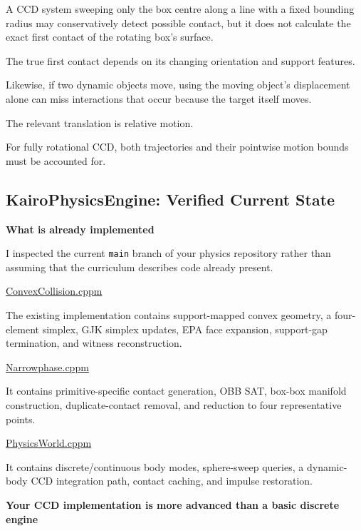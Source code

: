 A CCD system sweeping only the box centre along a line with a fixed bounding radius may conservatively detect possible contact, but it does not calculate the exact first contact of the rotating box's surface.

The true first contact depends on its changing orientation and support features.

Likewise, if two dynamic objects move, using the moving object's displacement alone can miss interactions that occur because the target itself moves.

The relevant translation is relative motion.

For fully rotational CCD, both trajectories and their pointwise motion bounds must be accounted for.

\subsection{KairoPhysicsEngine: Verified Current State}\label{04-visual-computing-ii-ch026-kairophysicsengine-verified-current-state}

\textbf{What is already implemented}

I inspected the current \texttt{main} branch of your physics repository rather than assuming that the curriculum describes code already present.

\href{https://github.com/swayam8624/KairoPhysicsEngine/blob/main/ConvexCollision.cppm?utm_source=chatgpt.com}{ConvexCollision.cppm}

The existing implementation contains support-mapped convex geometry, a four-element simplex, GJK simplex updates, EPA face expansion, support-gap termination, and witness reconstruction.

\href{https://github.com/swayam8624/KairoPhysicsEngine/blob/main/Narrowphase.cppm?utm_source=chatgpt.com}{Narrowphase.cppm}

It contains primitive-specific contact generation, OBB SAT, box-box manifold construction, duplicate-contact removal, and reduction to four representative points.

\href{https://github.com/swayam8624/KairoPhysicsEngine/blob/main/PhysicsWorld.cppm?utm_source=chatgpt.com}{PhysicsWorld.cppm}

It contains discrete/continuous body modes, sphere-sweep queries, a dynamic-body CCD integration path, contact caching, and impulse restoration.

\textbf{Your CCD implementation is more advanced than a basic discrete engine}

